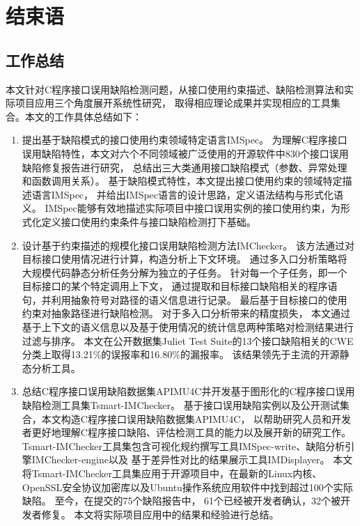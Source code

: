 \chapter{结束语}
\label{cha:con}

\section{工作总结}
本文针对C程序接口误用缺陷检测问题，从接口使用约束描述、缺陷检测算法和实际项目应用三个角度展开系统性研究，
取得相应理论成果并实现相应的工具集合。本文的工作具体总结如下：
\begin{enumerate}
	\item 提出基于缺陷模式的接口使用约束领域特定语言IMSpec。
	为理解C程序接口误用缺陷特性，本文对六个不同领域被广泛使用的开源软件中830个接口误用缺陷修复报告进行研究，
	总结出三大类通用接口缺陷模式（参数、异常处理和函数调用关系）。
	基于缺陷模式特性，本文提出接口使用约束的领域特定描述语言IMSpec，
	并给出IMSpec语言的设计思路，定义语法结构与形式化语义。
	IMSpec能够有效地描述实际项目中接口误用实例的接口使用约束，为形式化定义接口使用约束条件与接口缺陷检测打下基础。
	
	\item 设计基于约束描述的规模化接口误用缺陷检测方法IMChecker。
	该方法通过对目标接口使用情况进行计算，构造分析上下文环境。
	通过多入口分析策略将大规模代码静态分析任务分解为独立的子任务。
	针对每一个子任务，即一个目标接口的某个特定调用上下文，
	通过提取和目标接口缺陷相关的程序语句，并利用抽象符号对路径的语义信息进行记录。
	最后基于目标接口的使用约束对抽象路径进行缺陷检测。
	对于多入口分析带来的精度损失，
	本文通过基于上下文的语义信息以及基于使用情况的统计信息两种策略对检测结果进行过滤与排序。
	本文在公开数据集Juliet Test Suite的13个接口缺陷相关的CWE分类上取得13.21\%的误报率和16.80\%的漏报率。
	该结果领先于主流的开源静态分析工具。
	
	\item 总结C程序接口误用缺陷数据集APIMU4C并开发基于图形化的C程序接口误用缺陷检测工具集Tsmart-IMChecker。
	基于接口误用缺陷实例以及公开测试集合，本文构造C程序接口误用缺陷数据集APIMU4C，
	以帮助研究人员和开发者更好地理解C程序接口缺陷、评估检测工具的能力以及展开新的研究工作。
	Tsmart-IMChecker工具集包含可视化规约撰写工具IMSpec-write、缺陷分析引擎IMChecker-engine以及
	基于差异性对比的结果展示工具IMDisplayer。
	本文将Tsmart-IMChecker工具集应用于开源项目中，在最新的Linux内核、
	OpenSSL安全协议加密库以及Ubuntu操作系统应用软件中找到超过100个实际缺陷。
	至今，在提交的75个缺陷报告中，
	61个已经被开发者确认，32个被开发者修复。
	本文将实际项目应用中的结果和经验进行总结。
	
	
\end{enumerate}


